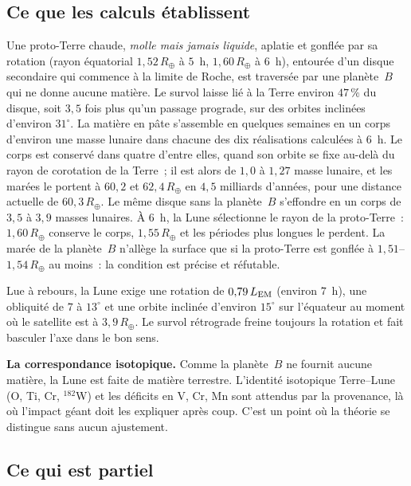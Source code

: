 \documentclass[11pt,a4paper]{article}
\newcommand{\Rt}{\ensuremath{R_\oplus}}
\newcommand{\LEM}{\ensuremath{L_{\rm EM}}}
\begin{document}
\subsection*{Ce que les calculs établissent}

Une proto-Terre chaude, \emph{molle mais jamais liquide}, aplatie et gonflée par sa rotation (rayon équatorial $1{,}52\,\Rt$ à $5$~h, $1{,}60\,\Rt$ à $6$~h), entourée d'un disque secondaire qui commence à la limite de Roche, est traversée par une planète~$B$ qui ne donne aucune matière. Le survol laisse lié à la Terre environ $47\,\%$ du disque, soit $3{,}5$ fois plus qu'un passage prograde, sur des orbites inclinées d'environ $31^\circ$. La matière en pâte s'assemble en quelques semaines en un corps d'environ une masse lunaire dans chacune des dix réalisations calculées à $6$~h. Le corps est conservé dans quatre d'entre elles, quand son orbite se fixe au-delà du rayon de corotation de la Terre~; il est alors de $1{,}0$ à $1{,}27$ masse lunaire, et les marées le portent à $60{,}2$ et $62{,}4\,\Rt$ en $4{,}5$ milliards d'années, pour une distance actuelle de $60{,}3\,\Rt$. Le même disque sans la planète~$B$ s'effondre en un corps de $3{,}5$ à $3{,}9$ masses lunaires. À $6$~h, la Lune sélectionne le rayon de la proto-Terre~: $1{,}60\,\Rt$ conserve le corps, $1{,}55\,\Rt$ et les périodes plus longues le perdent. La marée de la planète~$B$ n'allège la surface que si la proto-Terre est gonflée à $1{,}51$--$1{,}54\,\Rt$ au moins~: la condition est précise et réfutable.

Lue à rebours, la Lune exige une rotation de $0{,}79\,\LEM$ (environ $7$~h), une obliquité de $7$ à $13^\circ$ et une orbite inclinée d'environ $15^\circ$ sur l'équateur au moment où le satellite est à $3{,}9\,\Rt$. Le survol rétrograde freine toujours la rotation et fait basculer l'axe dans le bon sens.

\textbf{La correspondance isotopique.} Comme la planète~$B$ ne fournit aucune matière, la Lune est faite de matière terrestre. L'identité isotopique Terre--Lune (O, Ti, Cr, $^{182}$W) et les déficits en V, Cr, Mn sont attendus par la provenance, là où l'impact géant doit les expliquer après coup. C'est un point où la théorie se distingue sans aucun ajustement.

\subsection*{Ce qui est partiel}
\end{document}
